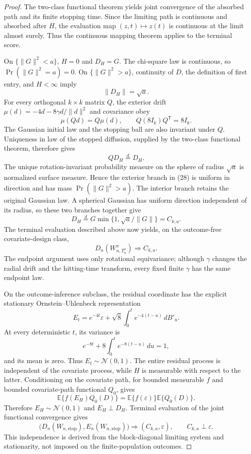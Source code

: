\documentclass{article}
\begin{document}
\begin{proof}
The two-class functional theorem yields joint convergence of the absorbed path and its finite stopping time.  Since the limiting path is continuous and absorbed after \(H\), the evaluation map \((z,t)\mapsto z(t)\) is continuous at the limit almost surely.  Thus the continuous mapping theorem applies to the terminal score.

On \(\{\|G\|^2<a\}\), \(H=0\) and \(D_H=G\).  The chi-square law is continuous, so \(\Pr(\|G\|^2=a)=0\).  On \(\{\|G\|^2>a\}\), continuity of \(D\), the definition of first entry, and \(H<\infty\) imply
\[
 \|D_H\|=\sqrt a. \tag{28}
\]
For every orthogonal \(k\times k\) matrix \(Q\), the exterior drift \(\mu(d)=-4d-8\gamma d/\|d\|^2\) and covariance obey
\[
 \mu(Qd)=Q\mu(d),\qquad Q(8I_k)Q^{\mathsf T}=8I_k. \tag{29}
\]
The Gaussian initial law and the stopping ball are also invariant under \(Q\).  Uniqueness in law of the stopped diffusion, supplied by the two-class functional theorem, therefore gives
\[
 QD_H\overset d=D_H. \tag{30}
\]
The unique rotation-invariant probability measure on the sphere of radius \(\sqrt a\) is normalized surface measure.  Hence the exterior branch in (28) is uniform in direction and has mass \(\Pr(\|G\|^2>a)\).  The interior branch retains the original Gaussian law.  A spherical Gaussian has uniform direction independent of its radius, so these two branches together give
\[
 D_H\overset d=G\min\{1,\sqrt a/\|G\|\}=C_{k,a}. \tag{31}
\]
The terminal evaluation described above now yields, on the outcome-free covariate-design class,
\[
 D_n(W^x_{n,T_n^x})\Rightarrow C_{k,a}. \tag{32}
\]
The endpoint argument uses only rotational equivariance; although \(\gamma\) changes the radial drift and the hitting-time transform, every fixed finite \(\gamma\) has the same endpoint law.

On the outcome-inference subclass, the residual coordinate has the explicit stationary Ornstein--Uhlenbeck representation
\[
 E_t=e^{-4t}\varepsilon+\sqrt8\int_0^t e^{-4(t-u)}\,dB'_u. \tag{33}
\]
At every deterministic \(t\), its variance is
\[
 e^{-8t}+8\int_0^t e^{-8(t-u)}\,du=1, \tag{34}
\]
and its mean is zero.  Thus \(E_t\sim\mathcal N(0,1)\).  The entire residual process is independent of the covariate process, while \(H\) is measurable with respect to the latter.  Conditioning on the covariate path, for bounded measurable \(f\) and bounded covariate-path functional \(Q_0\), gives
\[
 \mathbb E\{f(E_H)Q_0(D)\}
 =\mathbb E\{f(\varepsilon)\}\mathbb E\{Q_0(D)\}. \tag{35}
\]
Therefore \(E_H\sim\mathcal N(0,1)\) and \(E_H\perp D_H\).  Terminal evaluation of the joint functional convergence gives
\[
 \bigl(D_n(W_{n,\mathrm{stop}}),E_n(W_{n,\mathrm{stop}})\bigr)
 \Rightarrow(C_{k,a},\varepsilon),
 \qquad C_{k,a}\perp\varepsilon. \tag{36}
\]
This independence is derived from the block-diagonal limiting system and stationarity, not imposed on the finite-population outcomes.


\end{proof}
\end{document}
